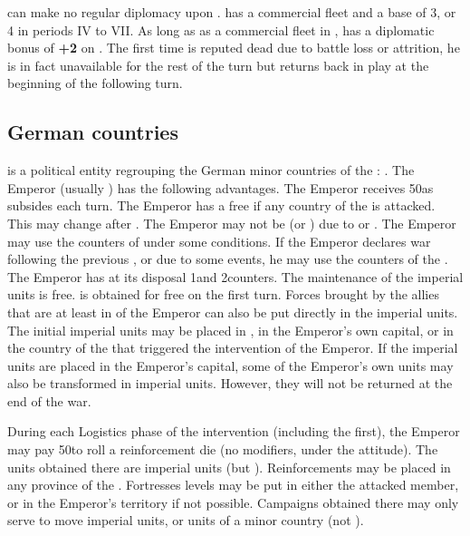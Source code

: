  \VEN can make no regular diplomacy upon
.
\aparag {} has a commercial fleet and a base \FTI of 3, or 4
in periods IV to VII.
\aparag As long as  as a commercial fleet in ,
\SPA has a diplomatic bonus of {\bf +2} on .
 The first time  is reputed dead
due to battle loss or attrition, he is in fact unavailable for the rest
of the turn but returns back in play at the beginning of the following
turn.

\subsection{German countries}

\label{chSpecific:HRE}
\aparag {} is a political entity regrouping the German
minor countries of the \HRE:
. The Emperor
(usually \HAB) has the following advantages.
\bparag The Emperor receives 50\ducats as subsides each turn.
\bparag The Emperor has a free \CB if any country of the \HRE is
attacked. This may change after .
\bparag The Emperor may not be \HAB (or \SPA) due to
 or .
The Emperor may use the counters of  under
some conditions.
If the Emperor declares war following the previous \CB, or due to some 
events, he may use the counters of the . The Emperor 
has at its disposal 1\ARMY and 2\LD counters.
The maintenance of the imperial units is free.
  \LD is obtained for free on the first turn.
\bparag Forces brought by the \HRE allies that are at least in \EW of
the Emperor can also be put directly in the imperial units.
 The initial imperial units may be placed
in , in the Emperor's own capital, or in the country
of the \HRE that triggered the intervention of the Emperor.
\bparag If the imperial units are placed in the Emperor's capital, some
of the Emperor's own units may also be transformed in imperial
units. However, they will not be returned at the end of the war.

\aparag[Reinforcements] During each Logistics phase of the intervention
(including the first), the Emperor may pay 50\ducats to roll a
reinforcement die (no modifiers, under the  attitude). The units
obtained there are imperial units (but ).
\bparag Reinforcements may be placed in any province of the \HRE.
\bparag Fortresses levels may be put in either the attacked \HRE member,
or in the Emperor's territory if not possible.
\bparag Campaigns obtained there may only serve to move imperial units,
or units of a \HRE minor country (not ).


